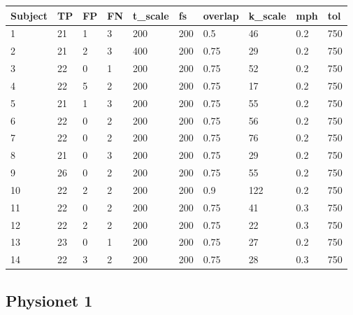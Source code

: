 \begin{table*}[h!]
	\begin{adjustbox}{width=\textwidth}
    \centering
    \begin{tabular}{l|lllllllll}
    	\toprule[0.5mm]
        Subject & TP & FP & FN & t\_scale & fs & overlap & k\_scale & mph & tol\\
        \midrule[0.3mm]
        1 & 21 & 1 & 3 & 200 & 200 & 0.5 & 46 & 0.2 & 750 \\ 
        2 & 21 & 2 & 3 & 400 & 200 & 0.75 & 29 & 0.2 & 750 \\ 
        3 & 22 & 0 & 1 & 200 & 200 & 0.75 & 52 & 0.2 & 750 \\ 
        4 & 22 & 5 & 2 & 200 & 200 & 0.75 & 17 & 0.2 & 750 \\ 
        5 & 21 & 1 & 3 & 200 & 200 & 0.75 & 55 & 0.2 & 750 \\ 
        6 & 22 & 0 & 2 & 200 & 200 & 0.75 & 56 & 0.2 & 750 \\ 
        7 & 22 & 0 & 2 & 200 & 200 & 0.75 & 76 & 0.2 & 750 \\ 
        8 & 21 & 0 & 3 & 200 & 200 & 0.75 & 29 & 0.2 & 750 \\ 
        9 & 26 & 0 & 2 & 200 & 200 & 0.75 & 55 & 0.2 & 750 \\ 
        10 & 22 & 2 & 2 & 200 & 200 & 0.9 & 122 & 0.2 & 750 \\ 
        11 & 22 & 0 & 2 & 200 & 200 & 0.75 & 41 & 0.3 & 750 \\ 
        12 & 22 & 2 & 2 & 200 & 200 & 0.75 & 22 & 0.3 & 750 \\ 
        13 & 23 & 0 & 1 & 200 & 200 & 0.75 & 27 & 0.2 & 750 \\ 
        14 & 22 & 3 & 2 & 200 & 200 & 0.75 & 28 & 0.3 & 750 \\
        \bottomrule[0.5mm]
    \end{tabular}
    \end{adjustbox}
\end{table*}

\subsection{Physionet 1}

